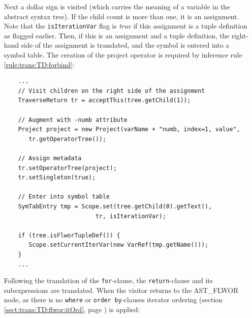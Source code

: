 Next a dollar sign is visited (which carries the meaning of a variable in the
abstract syntax tree). If the child count is more than one, it is an
assignment. Note that the \texttt{isIterationVar} flag is \textit{true} if
this assignment is a tuple definition as flagged earlier. Then, if this is an
assignment and a tuple definition, the right-hand side of the assignment is
translated, and the symbol is entered into a symbol table. The
creation of the project operator is required by inference rule
\ref{rule:trans:TD:forbind}:

\begin{Verbatim}
    ...      
    // Visit children on the right side of the assignment
    TraverseReturn tr = acceptThis(tree.getChild(1));
        
    // Augment with -numb attribute
    Project project = new Project(varName + "numb, index=1, value", 
       tr.getOperatorTree());

    // Assign metadata
    tr.setOperatorTree(project);
    tr.setSingleton(true);
     
    // Enter into symbol table
    SymTabEntry tmp = Scope.set(tree.getChild(0).getText(), 
                          tr, isIterationVar);
     
    if (tree.isFlworTupleDef()) {
       Scope.setCurrentIterVar(new VarRef(tmp.getName()));
    }
    ...    
\end{Verbatim}



Following the translation of the \texttt{for}-clause, the
\texttt{return}-clause and its subexpressions are translated. When the visitor returns to the AST\_FLWOR node, as there is no \texttt{where} or \texttt{order
by}-clauses iterator ordering (section \ref{sect:trans:TD:flwor:itOrd}, page \pageref{sect:trans:TD:flwor:itOrd})
is applied:

